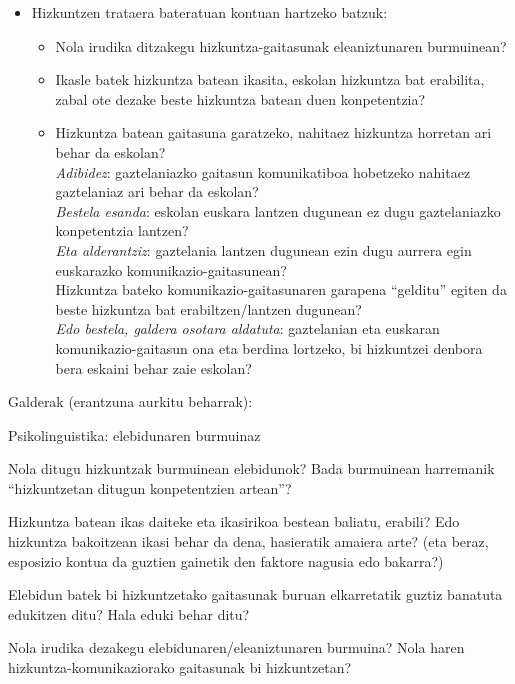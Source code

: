 \documentclass[
]{book}
\providecommand{\tightlist}{%
  \setlength{\itemsep}{0pt}\setlength{\parskip}{0pt}}
\begin{document}
\begin{itemize}
\tightlist
\item
  Hizkuntzen trataera bateratuan kontuan hartzeko batzuk:

  \begin{itemize}
  \tightlist
  \item
    Nola irudika ditzakegu hizkuntza-gaitasunak eleaniztunaren burmuinean?
  \item
    Ikasle batek hizkuntza batean ikasita, eskolan hizkuntza bat erabilita, zabal ote dezake beste hizkuntza batean duen konpetentzia?
  \item
    Hizkuntza batean gaitasuna garatzeko, nahitaez hizkuntza horretan ari behar da eskolan?\\
    \emph{Adibidez}: gaztelaniazko gaitasun komunikatiboa hobetzeko nahitaez gaztelaniaz ari behar da eskolan?\\
    \emph{Bestela esanda}: eskolan euskara lantzen dugunean ez dugu gaztelaniazko konpetentzia lantzen?\\
    \emph{Eta alderantziz}: gaztelania lantzen dugunean ezin dugu aurrera egin euskarazko komunikazio-gaitasunean?\\
    Hizkuntza bateko komunikazio-gaitasunaren garapena ``gelditu'' egiten da beste hizkuntza bat erabiltzen/lantzen dugunean?\\
    \emph{Edo bestela, galdera osotara aldatuta}: gaztelanian eta euskaran komunikazio-gaitasun ona eta berdina lortzeko, bi hizkuntzei denbora bera eskaini behar zaie eskolan?
  \end{itemize}
\end{itemize}

Galderak (erantzuna aurkitu beharrak):

Psikolinguistika: elebidunaren burmuinaz

Nola ditugu hizkuntzak burmuinean elebidunok? Bada burmuinean harremanik ``hizkuntzetan ditugun konpetentzien artean''?

Hizkuntza batean ikas daiteke eta ikasirikoa bestean baliatu, erabili? Edo hizkuntza bakoitzean ikasi behar da dena, hasieratik amaiera arte? (eta beraz, esposizio kontua da guztien gainetik den faktore nagusia edo bakarra?)

Elebidun batek bi hizkuntzetako gaitasunak buruan elkarretatik guztiz banatuta edukitzen ditu? Hala eduki behar ditu?

Nola irudika dezakegu elebidunaren/eleaniztunaren burmuina? Nola haren hizkuntza-komunikaziorako gaitasunak bi hizkuntzetan?
\end{document}
